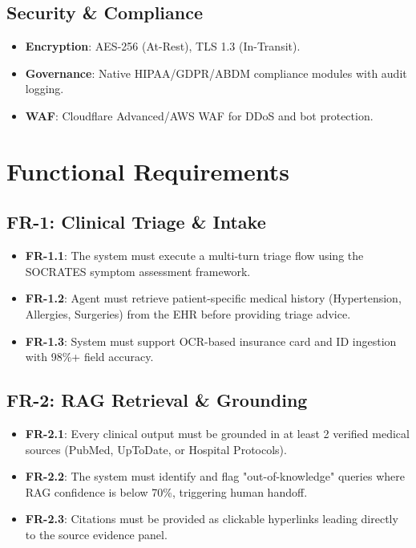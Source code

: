 \documentclass[12pt,a4paper]{article}
\begin{document}
\subsection{Security \& Compliance}
\begin{itemize}
    \item \textbf{Encryption}: AES-256 (At-Rest), TLS 1.3 (In-Transit).
    \item \textbf{Governance}: Native HIPAA/GDPR/ABDM compliance modules with audit logging.
    \item \textbf{WAF}: Cloudflare Advanced/AWS WAF for DDoS and bot protection.
\end{itemize}

\section{Functional Requirements}

\subsection{FR-1: Clinical Triage \& Intake}
\begin{itemize}
    \item \textbf{FR-1.1}: The system must execute a multi-turn triage flow using the SOCRATES symptom assessment framework.
    \item \textbf{FR-1.2}: Agent must retrieve patient-specific medical history (Hypertension, Allergies, Surgeries) from the EHR before providing triage advice.
    \item \textbf{FR-1.3}: System must support OCR-based insurance card and ID ingestion with 98\%+ field accuracy.
\end{itemize}

\subsection{FR-2: RAG Retrieval \& Grounding}
\begin{itemize}
    \item \textbf{FR-2.1}: Every clinical output must be grounded in at least 2 verified medical sources (PubMed, UpToDate, or Hospital Protocols).
    \item \textbf{FR-2.2}: The system must identify and flag "out-of-knowledge" queries where RAG confidence is below 70\%, triggering human handoff.
    \item \textbf{FR-2.3}: Citations must be provided as clickable hyperlinks leading directly to the source evidence panel.
\end{itemize}
\end{document}
